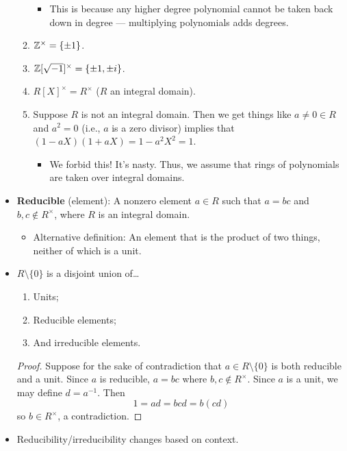 \documentclass[../notes.tex]{subfiles}
\begin{document}
\begin{itemize}
\begin{enumerate}
\begin{itemize}
            \item This is because any higher degree polynomial cannot be taken back down in degree --- multiplying polynomials adds degrees.
        \end{itemize}
        \item $\mathbb{Z}^\times=\{\pm 1\}$.
        \item $\mathbb{Z}[\sqrt{-1}]^\times=\{\pm 1,\pm i\}$.
        \item $R[X]^\times=R^\times$ ($R$ an integral domain).
        \item Suppose $R$ is not an integral domain. Then we get things like $a\neq 0\in R$ and $a^2=0$ (i.e., $a$ is a zero divisor) implies that $(1-aX)(1+aX)=1-a^2X^2=1$.
        \begin{itemize}
            \item We forbid this! It's nasty. Thus, we assume that rings of polynomials are taken over integral domains.
        \end{itemize}
    \end{enumerate}
    \item \textbf{Reducible} (element): A nonzero element $a\in R$ such that $a=bc$ and $b,c\notin R^\times$, where $R$ is an integral domain.
    \begin{itemize}
        \item Alternative definition: An element that is the product of two things, neither of which is a unit.
    \end{itemize}
    \item $R\setminus\{0\}$ is a disjoint union of\dots
    \begin{enumerate}[label={(\roman*)}]
        \item Units;
        \item Reducible elements;
        \item And irreducible elements.
    \end{enumerate}
    \begin{proof}
        Suppose for the sake of contradiction that $a\in R\setminus\{0\}$ is both reducible and a unit. Since $a$ is reducible, $a=bc$ where $b,c\notin R^\times$. Since $a$ is a unit, we may define $d=a^{-1}$. Then
        \begin{equation*}
            1 = ad
            = bcd
            = b(cd)
        \end{equation*}
        so $b\in R^\times$, a contradiction.
    \end{proof}
    \item Reducibility/irreducibility changes based on context.

\end{itemize}
\end{document}
